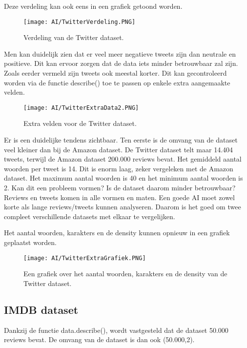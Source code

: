Deze verdeling kan ook eens in een grafiek getoond worden.

\begin{figure}[!htbp]
    \texttt{[image: AI/TwitterVerdeling.PNG]}
    \caption{\label{twittergrafiek}Verdeling van de Twitter dataset.}
\end{figure}
\FloatBarrier

Men kan duidelijk zien dat er veel meer negatieve tweets zijn dan neutrale en positieve. Dit kan ervoor zorgen dat de data iets minder betrouwbaar zal zijn. Zoals eerder vermeld zijn tweets ook meestal korter. Dit kan gecontroleerd worden via de functie describe() toe te passen op enkele extra aangemaakte velden.

\begin{figure}[!htbp]
    \texttt{[image: AI/TwitterExtraData2.PNG]}
    \caption{\label{twitterextradata}Extra velden voor de Twitter dataset.}
\end{figure}
\FloatBarrier

Er is een duidelijke tendens zichtbaar. Ten eerste is de omvang van de dataset veel kleiner dan bij de Amazon dataset. De Twitter dataset telt maar 14.404 tweets, terwijl de Amazon dataset 200.000 reviews bevat. Het gemiddeld aantal woorden per tweet is 14. Dit is enorm laag, zeker vergeleken met de Amazon dataset. Het maximum aantal woorden is 40 en het minimum aantal woorden is 2. 
Kan dit een probleem vormen? Is de dataset daarom minder betrouwbaar? Reviews en tweets komen in alle vormen en maten. Een goede AI moet zowel korte als lange reviews/tweets kunnen analyseren. Daarom is het goed om twee compleet verschillende datasets met elkaar te vergelijken. 

Het aantal woorden, karakters en de density kunnen opnieuw in een grafiek geplaatst worden.

\begin{figure}[!htbp]
    \texttt{[image: AI/TwitterExtraGrafiek.PNG]}
    \caption{\label{twitterextragrafiek}Een grafiek over het aantal woorden, karakters en de density van de Twitter dataset.}
\end{figure}
\FloatBarrier

\subsection{IMDB dataset}
Dankzij de functie data.describe(), wordt vastgesteld dat de dataset 50.000 reviews bevat. De omvang van de dataset is dan ook (50.000,2).

